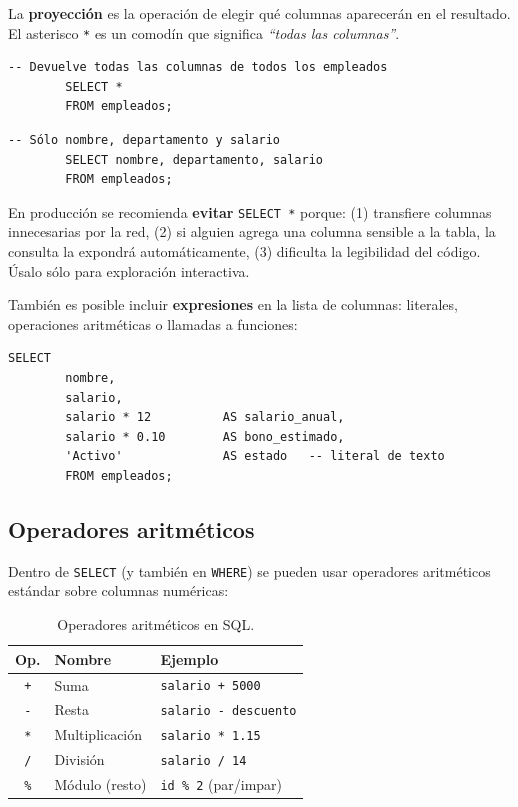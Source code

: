 \documentclass[12pt, a4paper]{article}
\begin{document}
	La \textbf{proyección} es la operación de elegir qué columnas
	aparecerán en el resultado.
	El asterisco \texttt{*} es un comodín que significa
	\textit{``todas las columnas''}.
	
	\begin{lstlisting}[caption={Seleccionar todas las columnas.}]
		-- Devuelve todas las columnas de todos los empleados
		SELECT *
		FROM empleados;
	\end{lstlisting}
	
	\begin{lstlisting}[caption={Seleccionar columnas específicas.}]
		-- Sólo nombre, departamento y salario
		SELECT nombre, departamento, salario
		FROM empleados;
	\end{lstlisting}
	
	\begin{nota}
		En producción se recomienda \textbf{evitar} \texttt{SELECT *} porque:
		(1) transfiere columnas innecesarias por la red,
		(2) si alguien agrega una columna sensible a la tabla, la consulta
		la expondrá automáticamente,
		(3) dificulta la legibilidad del código.
		Úsalo sólo para exploración interactiva.
	\end{nota}
	
	También es posible incluir \textbf{expresiones} en la lista de
	columnas: literales, operaciones aritméticas o llamadas a funciones:
	
	\begin{lstlisting}[caption={Columnas calculadas y literales en SELECT.}]
		SELECT
		nombre,
		salario,
		salario * 12          AS salario_anual,
		salario * 0.10        AS bono_estimado,
		'Activo'              AS estado   -- literal de texto
		FROM empleados;
	\end{lstlisting}
	
	\subsection{Operadores aritméticos}
	
	Dentro de \texttt{SELECT} (y también en \texttt{WHERE}) se pueden
	usar operadores aritméticos estándar sobre columnas numéricas:
	
	\begin{table}[H]
		\centering
		\small
		\renewcommand{\arraystretch}{1.4}
		\begin{tabularx}{\linewidth}{@{} c l X @{}}
			\toprule
			\textbf{Op.} & \textbf{Nombre} & \textbf{Ejemplo} \\
			\midrule
			\texttt{+}  & Suma            & \texttt{salario + 5000} \\
			\texttt{-}  & Resta           & \texttt{salario - descuento} \\
			\texttt{*}  & Multiplicación  & \texttt{salario * 1.15} \\
			\texttt{/}  & División        & \texttt{salario / 14} \\
			\texttt{\%} & Módulo (resto)  & \texttt{id \% 2} (par/impar) \\
			\bottomrule
		\end{tabularx}
		\caption{Operadores aritméticos en SQL.}
		\label{tab:operadores-aritmeticos}
	\end{table}
	
\end{document}
